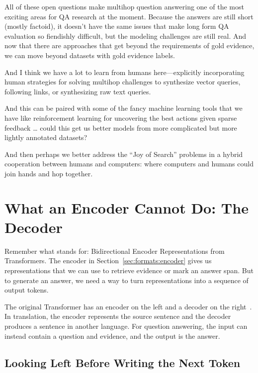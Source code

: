 All of these open questions make multihop question answering one of the most exciting areas for QA research at the moment.  Because the answers are still short (mostly factoid), it doesn’t have the same issues that make long form QA evaluation so fiendishly difficult, but the modeling challenges are still real.  And now that there are approaches that get beyond the requirements of gold evidence, we can move beyond datasets with gold evidence labels.

And I think we have a lot to learn from humans here—explicitly incorporating human strategies for solving multihop challenges to synthesize vector queries, following links, or synthesizing raw text queries.

And this can be paired with some of the fancy machine learning tools that we have like reinforcement learning for uncovering the best actions given sparse feedback … could this get us better models from more complicated but more lightly annotated datasets?

And then perhaps we better address the “Joy of Search” problems in a hybrid cooperation between humans and computers: where computers and humans could join hands and hop together.

\section{What an Encoder Cannot Do: The Decoder}
\label{sec:methods:decoder}

Remember what  stands for: Bidirectional Encoder Representations from Transformers.  The encoder in Section~\ref{sec:formats:encoder} gives us representations that we can use to retrieve evidence or mark an answer span.  But to generate an answer, we need a way to turn representations into a sequence of output tokens.

The original Transformer has an encoder on the left and a decoder on the right~\citep{vaswani-17}.  In translation, the encoder represents the source sentence and the decoder produces a sentence in another language.  For question answering, the input can instead contain a question and evidence, and the output is the answer.

\subsection{Looking Left Before Writing the Next Token}

